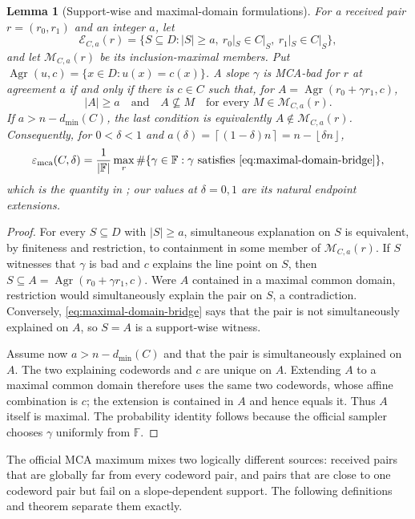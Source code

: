\documentclass[11pt,a4paper]{amsart}
\numberwithin{equation}{section}
\newtheorem{lemma}[lemma]{Lemma}
\theoremstyle{remark}
\newcommand{\F}{\mathbb F}
\newcommand{\abs}[1]{\lvert #1\rvert}
\newcommand{\floor}[1]{\left\lfloor #1\right\rfloor}
\newcommand{\ceil}[1]{\left\lceil #1\right\rceil}
\begin{document}
\begin{lemma}[Support-wise and maximal-domain formulations]
\label{lem:mca-definition-bridge}
For a received pair \(r=(r_0,r_1)\) and an integer \(a\), let
\[
 \mathcal E_{C,a}(r)=\{S\subseteq D:\abs S\ge a,
     \ r_0|_S\in C|_S,\ r_1|_S\in C|_S\},
\]
and let \(\mathcal M_{C,a}(r)\) be its inclusion-maximal members.  Put
\(\operatorname{Agr}(u,c)=\{x\in D:u(x)=c(x)\}\).  A slope \(\gamma\)
is MCA-bad for \(r\) at agreement \(a\) if and only if there is \(c\in C\)
such that, for \(A=\operatorname{Agr}(r_0+\gamma r_1,c)\),
\[
 \abs A\ge a\quad\text{and}\quad
 A\nsubseteq M\quad\text{for every }M\in\mathcal M_{C,a}(r). \tag{MDB}
 \label{eq:maximal-domain-bridge}
\]
If \(a>n-d_{\min}(C)\), the last condition is equivalently
\(A\notin\mathcal M_{C,a}(r)\).  Consequently, for \(0<\delta<1\) and
\(a(\delta)=\ceil{(1-\delta)n}=n-\floor{\delta n}\),
\[
 \varepsilon_{\rm mca}(C,\delta)=\frac1{\abs\F}
 \max_r\#\{\gamma\in\F:\gamma\text{ satisfies \eqref{eq:maximal-domain-bridge}}\},
\]
which is the quantity in \cite[Definition~4.3]{ABF26}; our values at
\(\delta=0,1\) are its natural endpoint extensions.
\end{lemma}

\begin{proof}
For every \(S\subseteq D\) with \(\abs S\ge a\), simultaneous
explanation on \(S\) is equivalent, by finiteness and restriction, to
containment in some member of \(\mathcal M_{C,a}(r)\).  If \(S\) witnesses
that \(\gamma\) is bad and \(c\) explains the line point on \(S\), then
\(S\subseteq A=\operatorname{Agr}(r_0+\gamma r_1,c)\).  Were \(A\)
contained in a maximal common domain, restriction would simultaneously
explain the pair on \(S\), a contradiction.  Conversely,
\eqref{eq:maximal-domain-bridge} says that the pair is not simultaneously
explained on \(A\), so \(S=A\) is a support-wise witness.

Assume now \(a>n-d_{\min}(C)\) and that the pair is simultaneously
explained on \(A\).  The two explaining codewords and \(c\) are unique on
\(A\).  Extending \(A\) to a maximal common domain therefore uses the same
two codewords, whose affine combination is \(c\); the extension is contained
in \(A\) and hence equals it.  Thus \(A\) itself is maximal.  The probability
identity follows because the official sampler chooses \(\gamma\) uniformly
from \(\F\).
\end{proof}

The official MCA maximum mixes two logically different sources: received
pairs that are globally far from every codeword pair, and pairs that are
close to one codeword pair but fail on a slope-dependent support.  The
following definitions and theorem separate them exactly.
\end{document}
